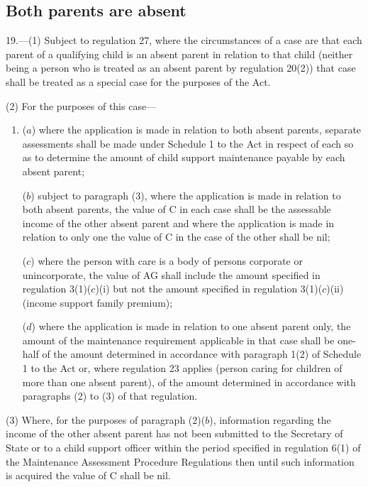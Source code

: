 \documentclass[12pt,a4paper]{article}
\begin{document}
\renewcommand\parthead{--- Part III}

\subsection[19. Both parents are absent]{Both parents are absent}

19.—(1) Subject to regulation 27, where the circumstances of a case are that each parent of a qualifying child is an absent parent in relation to that child (neither being a person who is treated as an absent parent by regulation 20(2)) that case shall be treated as a special case for the purposes of the Act.

(2) For the purposes of this case—
\begin{enumerate}\item[]
($a$) where the application is made in relation to both absent parents, separate assessments shall be made under Schedule 1 to the Act in respect of each so as to determine the amount of child support maintenance payable by each absent parent;

($b$) subject to paragraph (3), where the application is made in relation to both absent parents, the value of C in each case shall be the assessable income of the other absent parent and where the application is made in relation to only one the value of C in the case of the other shall be nil;

($c$) where the person with care is a body of persons corporate or unincorporate, the value of AG shall 
include the amount specified in regulation 3(1)($c$)(i) but not the amount specified in regulation 3(1)($c$)(ii) (income support family premium);  %

($d$) where the application is made in relation to one absent parent only, the amount of the maintenance requirement applicable in that case shall be one-half of the amount determined in accordance with paragraph 1(2) of Schedule 1 to the Act or, where regulation 23 applies (person caring for children of more than one absent parent), of the amount determined in accordance with paragraphs (2) to (3) of that regulation.
\end{enumerate}

(3) Where, for the purposes of paragraph (2)($b$), information regarding the income of the other absent parent has not been submitted to the Secretary of State or to a child support officer within the period specified in regulation 6(1) of the Maintenance Assessment Procedure Regulations then until such information is acquired the value of C shall be nil.
\end{document}
